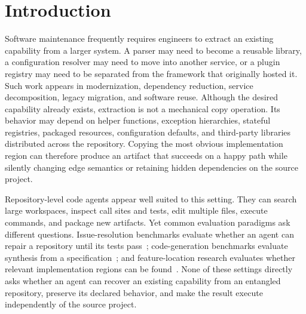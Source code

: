 \documentclass[acmsmall,screen,review,anonymous]{acmart}
\begin{document}


\maketitle

\section{Introduction}

Software maintenance frequently requires engineers to extract an existing
capability from a larger system. A parser may need to become a reusable library,
a configuration resolver may need to move into another service, or a plugin
registry may need to be separated from the framework that originally hosted it.
Such work appears in modernization, dependency reduction, service decomposition,
legacy migration, and software reuse. Although the desired capability already
exists, extraction is not a mechanical copy operation. Its behavior may depend
on helper functions, exception hierarchies, stateful registries, packaged
resources, configuration defaults, and third-party libraries distributed across
the repository. Copying the most obvious implementation region can therefore
produce an artifact that succeeds on a happy path while silently changing edge
semantics or retaining hidden dependencies on the source project.

Repository-level code agents appear well suited to this setting. They can search
large workspaces, inspect call sites and tests, edit multiple files, execute
commands, and package new artifacts. Yet common evaluation paradigms ask
different questions. Issue-resolution benchmarks evaluate whether an agent can
repair a repository until its tests pass~\cite{jimenez2024swebench}; code-generation
benchmarks evaluate synthesis from a specification~\cite{chen2021codex}; and
feature-location research evaluates whether relevant implementation regions can
be found~\cite{dit2013featurelocation}. None of these settings directly asks
whether an agent can recover an existing capability from an entangled repository,
preserve its declared behavior, and make the result execute independently of the
source project.
\end{document}
